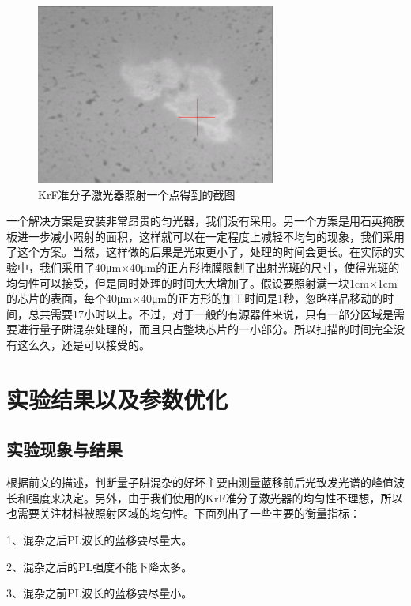 \documentclass{ZJUthesis}
\begin{document}
\begin{figure}[!t]
    \centering
    \includegraphics[width=0.7\textwidth]{./Pictures/uv_spot.eps}
    \caption{KrF准分子激光器照射一个点得到的截图}
    \label{fig_uv_spot}
\end{figure}

一个解决方案是安装非常昂贵的匀光器，我们没有采用。另一个方案是用石英掩膜板进一步减小照射的面积，这样就可以在一定程度上减轻不均匀的现象，我们采用了这个方案。当然，这样做的后果是光束更小了，处理的时间会更长。在实际的实验中，我们采用了40μm×40μm的正方形掩膜限制了出射光斑的尺寸，使得光斑的均匀性可以接受，但是同时处理的时间大大增加了。假设要照射满一块1cm×1cm的芯片的表面，每个40μm×40μm的正方形的加工时间是1秒，忽略样品移动的时间，总共需要17小时以上。不过，对于一般的有源器件来说，只有一部分区域是需要进行量子阱混杂处理的，而且只占整块芯片的一小部分。所以扫描的时间完全没有这么久，还是可以接受的。

\section{实验结果以及参数优化}

\subsection{实验现象与结果}

根据前文的描述，判断量子阱混杂的好坏主要由测量蓝移前后光致发光谱的峰值波长和强度来决定。另外，由于我们使用的KrF准分子激光器的均匀性不理想，所以也需要关注材料被照射区域的均匀性。下面列出了一些主要的衡量指标：

1、混杂之后PL波长的蓝移要尽量大。

2、混杂之后的PL强度不能下降太多。

3、混杂之前PL波长的蓝移要尽量小。
\end{document}
